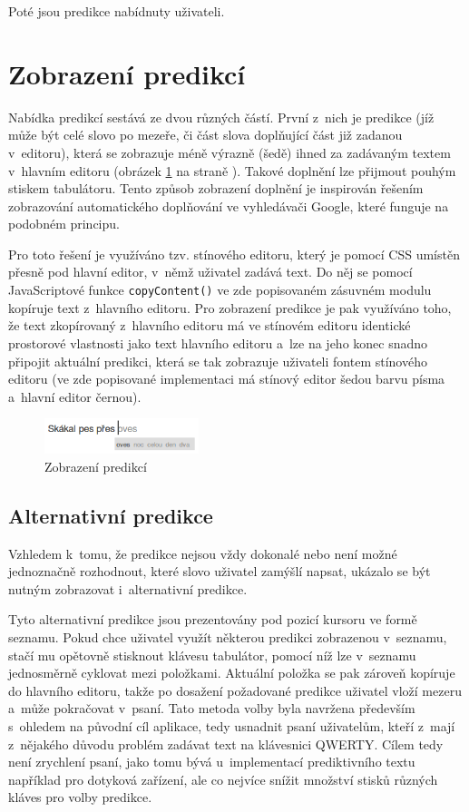 \documentclass[a4paper,11pt,openany]{book} %
\begin{document}
Poté jsou predikce nabídnuty uživateli.

\section{Zobrazení predikcí}

Nabídka predikcí sestává ze dvou různých částí. První z~nich je predikce (jíž může být celé slovo po mezeře, či část slova doplňující část již zadanou v~editoru), která se zobrazuje méně výrazně (šedě) ihned za zadávaným textem v~hlavním editoru (obrázek \ref{fig:nlp-predict} na straně \pageref{fig:nlp-predict}). Takové doplnění lze přijmout pouhým stiskem tabulátoru. Tento způsob zobrazení doplnění je inspirován řešením zobrazování automatického doplňování ve vyhledávači Google, které funguje na podobném principu. 

Pro toto řešení je využíváno tzv. stínového editoru, který je pomocí CSS umístěn přesně pod hlavní editor, v~němž uživatel zadává text. Do něj se pomocí JavaScriptové funkce {\tt copyContent()} ve zde popisovaném zásuvném modulu kopíruje text z~hlavního editoru. Pro zobrazení predikce je pak využíváno toho, že text zkopírovaný z~hlavního editoru má ve stínovém editoru identické prostorové vlastnosti jako text hlavního editoru a~lze na jeho konec snadno připojit aktuální predikci, která se tak zobrazuje uživateli fontem stínového editoru (ve zde popisované implementaci má stínový editor šedou barvu písma a~hlavní editor černou).

\begin{figure}[ht]
	\centering
	\includegraphics[width=0.4\textwidth]{nlp_predict_1}
	\caption{Zobrazení predikcí}
	\label{fig:nlp-predict}
\end{figure}

\subsection{Alternativní predikce}

Vzhledem k~tomu, že predikce nejsou vždy dokonalé nebo není možné jednoznačně rozhodnout, které slovo uživatel zamýšlí napsat, ukázalo se být nutným zobrazovat i~alternativní predikce. 

Tyto alternativní predikce jsou prezentovány pod pozicí kursoru ve formě seznamu. Pokud chce uživatel využít některou predikci zobrazenou v~seznamu, stačí mu opětovně stisknout klávesu tabulátor, pomocí níž lze v~seznamu jednosměrně cyklovat mezi položkami. Aktuální položka se pak zároveň kopíruje do hlavního editoru, takže po dosažení požadované predikce uživatel vloží mezeru a~může pokračovat v~psaní. Tato metoda volby byla navržena především s~ohledem na původní cíl aplikace, tedy usnadnit psaní uživatelům, kteří z~mají z~nějakého důvodu problém zadávat text na klávesnici QWERTY. Cílem tedy není zrychlení psaní, jako tomu bývá u~implementací prediktivního textu například pro dotyková zařízení, ale co nejvíce snížit množství stisků různých kláves pro volby predikce.
\end{document}
